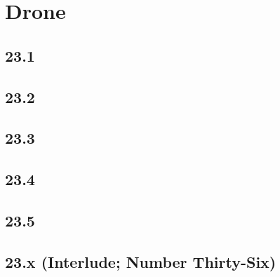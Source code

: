 \part{Drone}
 \chapter{23.1}
 \chapter{23.2}
 \chapter{23.3}
 \chapter{23.4}
 \chapter{23.5}
 \chapter{23.x (Interlude; Number Thirty-Six)}







